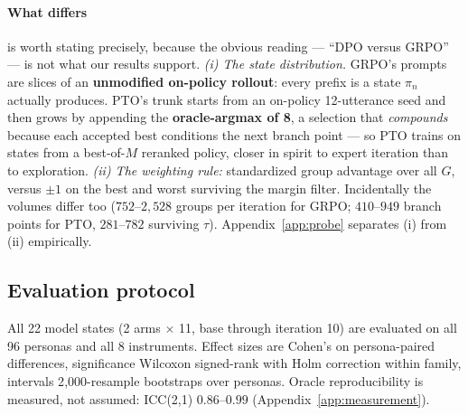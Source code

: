 \paragraph{What differs} is worth stating precisely, because the obvious reading --- ``DPO
versus GRPO'' --- is not what our results support. \emph{(i) The state distribution.} GRPO's
prompts are slices of an \textbf{unmodified on-policy rollout}: every prefix is a state $\pi_n$
actually produces. PTO's trunk starts from an on-policy 12-utterance seed and then grows by
appending the \textbf{oracle-argmax of 8}, a selection that \emph{compounds} because each
accepted best conditions the next branch point --- so PTO trains on states from a best-of-$M$
reranked policy, closer in spirit to expert iteration than to exploration. \emph{(ii) The
weighting rule:} standardized group advantage over all $G$, versus $\pm1$ on the best and worst
surviving the margin filter. Incidentally the volumes differ too ($752$--$2{,}528$ groups per
iteration for GRPO; $410$--$949$ branch points for PTO, $281$--$782$ surviving $\tau$).
Appendix~\ref{app:probe} separates (i) from (ii) empirically.

\subsection{Evaluation protocol}
All 22 model states (2 arms $\times$ 11, base through iteration 10) are evaluated on all 96
personas and all 8 instruments. Effect sizes are Cohen's \dz{} on persona-paired differences,
significance Wilcoxon signed-rank with Holm correction within family, intervals 2{,}000-resample
bootstraps over personas. Oracle reproducibility is measured, not assumed: ICC(2,1)
$0.86$--$0.99$ (Appendix~\ref{app:measurement}).
